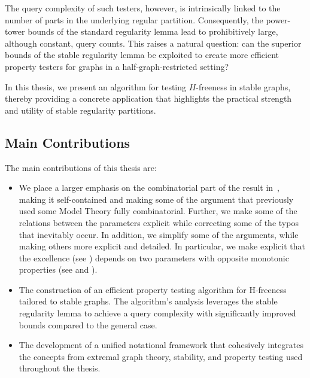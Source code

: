     \jojo

    The query complexity of such testers, however, is intrinsically linked to the number of parts in the underlying regular
    partition.
    Consequently, the power-tower bounds of the standard regularity lemma lead to prohibitively large, although constant,
    query counts.
    This raises a natural question: can the superior bounds of the stable regularity lemma be exploited to create more
    efficient property testers for graphs in a half-graph-restricted setting?

    In this thesis, we present an algorithm for testing $H$-freeness in stable graphs, thereby providing
    a concrete application that highlights the practical strength and utility of stable regularity partitions.

    \subsection{Main Contributions} \label{subsec:main_contributions}

        The main contributions of this thesis are:
        \begin{itemize}
            \item We place a larger emphasis on the combinatorial part of the result
                in~\cite{regularity_lemmas_for_stable_graphs}, making it self-contained and making some of the argument that
                previously used some Model Theory fully combinatorial.
                Further, we make some of the relations between the parameters explicit while correcting some of the typos
                that inevitably occur.
                In addition, we simplify some of the arguments, while making others more explicit and detailed.
                In particular, we make explicit that the excellence (see ) depends on two parameters
                with opposite monotonic properties (see  and ).
            \item The construction of an efficient property testing algorithm for H-freeness tailored to stable graphs.
                The algorithm's analysis leverages the stable regularity lemma to achieve a query complexity with significantly
                improved bounds compared to the general case.
            \item The development of a unified notational framework that cohesively integrates the concepts from
                extremal graph theory, stability, and property testing used throughout the thesis.
        \end{itemize}

